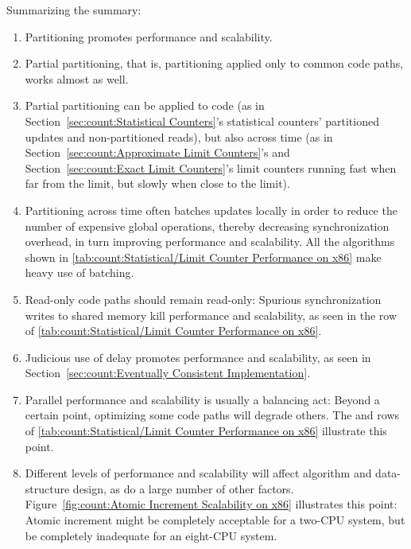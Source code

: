 Summarizing the summary:

\begin{enumerate}
\item	Partitioning promotes performance and scalability.
\item	Partial partitioning, that is, partitioning applied only to
	common code paths, works almost as well.
\item	Partial partitioning can be applied to code (as in
	Section~\ref{sec:count:Statistical Counters}'s statistical
	counters' partitioned updates and non-partitioned reads), but also
	across time (as in
	Section~\ref{sec:count:Approximate Limit Counters}'s and
	Section~\ref{sec:count:Exact Limit Counters}'s
	limit counters running fast when far from
	the limit, but slowly when close to the limit).
\item	Partitioning across time often batches updates locally
	in order to reduce the number of expensive global operations,
	thereby decreasing synchronization overhead, in turn
	improving performance and scalability.
	All the algorithms shown in
	\cref{tab:count:Statistical/Limit Counter Performance on x86}
	make heavy use of batching.
\item	Read-only code paths should remain read-only:  Spurious
	synchronization writes to shared memory kill performance
	and scalability, as seen in the  row of
	\cref{tab:count:Statistical/Limit Counter Performance on x86}.
\item	Judicious use of delay promotes performance and scalability, as
	seen in Section~\ref{sec:count:Eventually Consistent Implementation}.
\item	Parallel performance and scalability is usually a balancing act:
	Beyond a certain point, optimizing some code paths will degrade
	others.
	The  and  rows of
	\cref{tab:count:Statistical/Limit Counter Performance on x86}
	illustrate this point.
\item	Different levels of performance and scalability will affect
	algorithm and data-structure design, as do a large number of
	other factors.
	Figure~\ref{fig:count:Atomic Increment Scalability on x86}
	illustrates this point:  Atomic increment might be completely
	acceptable for a two-CPU system, but be completely inadequate for an
	eight-CPU system.
\end{enumerate}

